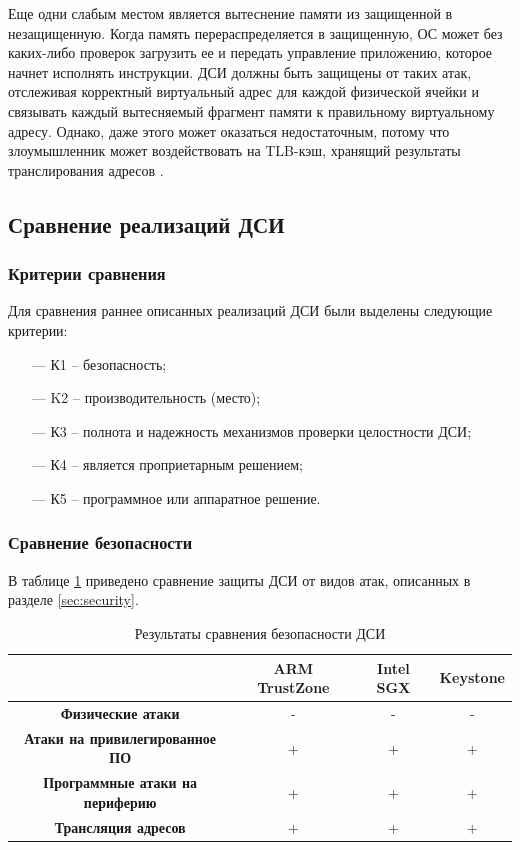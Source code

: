 Еще одни слабым местом является вытеснение памяти из защищенной в незащищенную. Когда память перераспределяется в защищенную, ОС может без каких-либо проверок загрузить ее и передать управление приложению, которое начнет исполнять инструкции. ДСИ должны быть защищены от таких атак, отслеживая корректный виртуальный адрес для каждой физической ячейки и связывать каждый вытесняемый фрагмент памяти к правильному виртуальному адресу. Однако, даже этого может оказаться недостаточным, потому что злоумышленник может воздействовать на TLB-кэш, хранящий результаты транслирования адресов \cite{attack-on-chip}.

\subsection{Сравнение реализаций ДСИ}

\subsubsection{Критерии сравнения}

Для сравнения раннее описанных реализаций ДСИ были выделены следующие критерии:

\begin{itemize}
	\item [---] К1 -- безопасность;
	\item [---] K2 -- производительность (место);
	\item [---] К3 -- полнота и надежность механизмов проверки целостности ДСИ;
	\item [---] К4 -- является проприетарным решением;
	\item [---] К5 -- программное или аппаратное решение.
\end{itemize}

\subsubsection{Сравнение безопасности}

В таблице \ref{table:security-features} приведено сравнение защиты ДСИ от видов атак, описанных в разделе \ref{sec:security}.

\begin{table}[!htb]
	\begin{center}
		\caption{Результаты сравнения безопасности ДСИ}
		\label{table:security-features}
		\begin{tabular}{|c|c|c|c|}
			\hline
			& \bfseries ARM TrustZone & \bfseries Intel SGX & \bfseries Keystone \\
			\hline
			\bfseries Физические атаки & - & - & - \\ \hline
			\bfseries Атаки на привилегированное ПО & + & + & + \\ \hline
			\bfseries Программные атаки на периферию & + & + & + \\ \hline	
			\bfseries Трансляция адресов & + & + & + \\ \hline	
		\end{tabular}
	\end{center}
\end{table}


